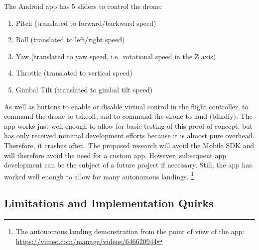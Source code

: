 The Android app has 5 sliders to control the drone:
\begin{enumerate}
    \item Pitch (translated to forward/backward speed)
    \item Roll (translated to left/right speed)
    \item Yaw (translated to yaw speed, i.e.~rotational speed in the Z axis)
    \item Throttle (translated to vertical speed)
    \item Gimbal Tilt (translated to gimbal tilt speed)
\end{enumerate}
As well as buttons to enable or disable virtual control in the flight controller,
to command the drone to takeoff,
and to command the drone to land (blindly).
The app works just well enough to allow for basic testing of this proof of concept,
but has only received minimal development efforts because it is almost pure overhead.
Therefore, it crashes often.
The proposed research will avoid the Mobile SDK and will therefore avoid the need for a custom app.
However, subsequent app development can be the subject of a future project if necessary.
Still, the app has worked well enough to allow for many autonomous landings.
\footnote{The autonomous landing demonstration from the point of view of the app: \url{https://vimeo.com/manage/videos/646620944}}

\subsection{Limitations and Implementation Quirks}

